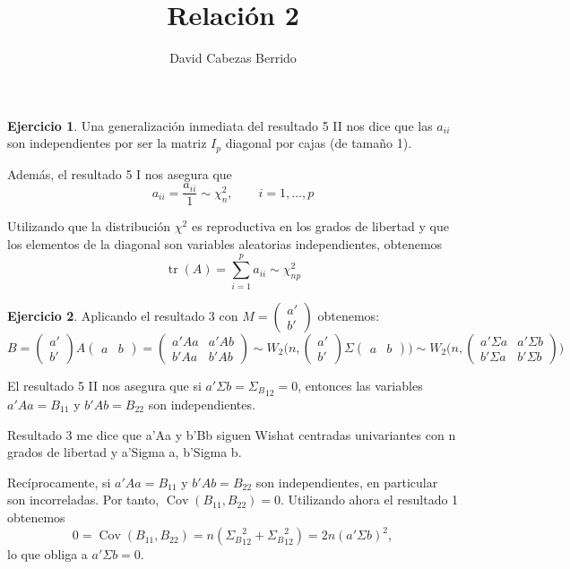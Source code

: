 \documentclass[12pt,spanish]{article}
\title{Relación 2}
\author{David Cabezas Berrido}
\date{}
\theoremstyle{definition}
\newtheorem{exercise}{Ejercicio}
\begin{document}
\maketitle


\begin{exercise} %
  Una generalización inmediata del resultado 5 II nos dice que las
  $a_{ii}$ son independientes por ser la matriz $I_p$ diagonal por
  cajas (de tamaño 1).

  Además, el resultado 5 I nos asegura
  que \[a_{ii}=\frac{a_{ii}}{1}\sim \chi^2_n,\qquad i=1,\ldots,p\]
  
  Utilizando que la distribución $\chi^2$ es reproductiva en los
  grados de libertad y que los elementos de la diagonal son variables
  aleatorias independientes, obtenemos
  \[\operatorname{tr}(A)=\sum_{i=1}^pa_{ii}\sim \chi^2_{np}\]
\end{exercise}

\begin{exercise} %

  Aplicando el resultado 3 con $M=\begin{pmatrix}a' \\ b'\end{pmatrix}$ obtenemos:
  \[B=
    \begin{pmatrix}
      a' \\ b'
    \end{pmatrix} A
    \begin{pmatrix}
      a & b
    \end{pmatrix}=
    \begin{pmatrix}
      a'Aa & a'Ab \\ b'Aa & b'A b
    \end{pmatrix} \sim W_2\Bigg(n,\begin{pmatrix}
      a' \\ b'
    \end{pmatrix} \Sigma
    \begin{pmatrix}
      a & b
    \end{pmatrix}\Bigg)\sim W_2\Bigg(n,\begin{pmatrix}
      a'\Sigma a & a'\Sigma b \\ b'\Sigma a & b'\Sigma b
    \end{pmatrix}\Bigg)
  \]

  El resultado 5 II nos asegura que si $a'\Sigma b={\Sigma_B}_{12}=0$,
  entonces las variables $a'Aa=B_{11}$ y $b'Ab=B_{22}$ son
  independientes.
  
  Resultado 3 me dice que a'Aa y b'Bb siguen Wishat centradas
  univariantes con n grados de libertad y a'Sigma a, b'Sigma b.

  Recíprocamente, si $a'Aa=B_{11}$ y $b'Ab=B_{22}$ son independientes,
  en particular son incorreladas. Por tanto,
  $\operatorname{Cov}(B_{11},B_{22})=0$. Utilizando ahora el resultado 1 obtenemos
  \[0=\operatorname{Cov}(B_{11},B_{22})=n({\Sigma_B}_{12}^2+{\Sigma_B}_{12}^2)=2n(a'\Sigma b)^2,\]
  lo que obliga a $a'\Sigma b=0$.
\end{exercise}
\end{document}
